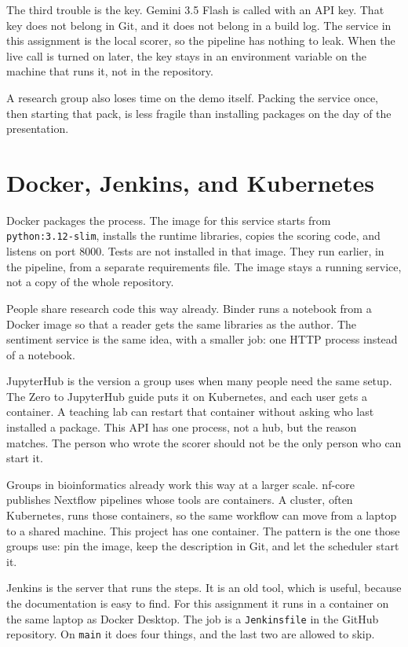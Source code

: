 \documentclass[12pt,a4paper]{article}
\begin{document}
The third trouble is the key. Gemini 3.5 Flash is called with an API key. That key does not belong in Git, and it does not belong in a build log. The service in this assignment is the local scorer, so the pipeline has nothing to leak. When the live call is turned on later, the key stays in an environment variable on the machine that runs it, not in the repository.

A research group also loses time on the demo itself. Packing the service once, then starting that pack, is less fragile than installing packages on the day of the presentation.

\section{Docker, Jenkins, and Kubernetes}

Docker packages the process. The image for this service starts from \texttt{python:3.12-slim}, installs the runtime libraries, copies the scoring code, and listens on port 8000. Tests are not installed in that image. They run earlier, in the pipeline, from a separate requirements file. The image stays a running service, not a copy of the whole repository.

People share research code this way already. Binder runs a notebook from a Docker image so that a reader gets the same libraries as the author. The sentiment service is the same idea, with a smaller job: one HTTP process instead of a notebook.

JupyterHub is the version a group uses when many people need the same setup. The Zero to JupyterHub guide puts it on Kubernetes, and each user gets a container. A teaching lab can restart that container without asking who last installed a package. This API has one process, not a hub, but the reason matches. The person who wrote the scorer should not be the only person who can start it.

Groups in bioinformatics already work this way at a larger scale. nf-core publishes Nextflow pipelines whose tools are containers. A cluster, often Kubernetes, runs those containers, so the same workflow can move from a laptop to a shared machine. This project has one container. The pattern is the one those groups use: pin the image, keep the description in Git, and let the scheduler start it.

Jenkins is the server that runs the steps. It is an old tool, which is useful, because the documentation is easy to find. For this assignment it runs in a container on the same laptop as Docker Desktop. The job is a \texttt{Jenkinsfile} in the GitHub repository. On \texttt{main} it does four things, and the last two are allowed to skip.
\end{document}
